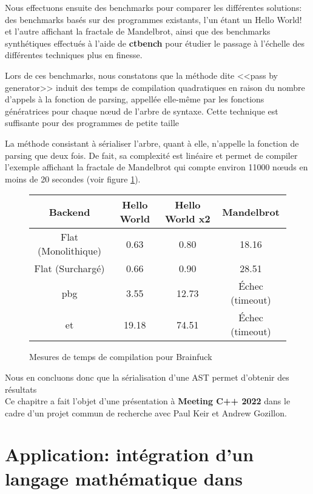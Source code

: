 \documentclass[main]{subfiles}
\begin{document}
Nous effectuons ensuite des benchmarks pour comparer
les diff\'erentes solutions: des benchmarks bas\'es sur
des programmes existants, l'un \'etant un Hello World! et l'autre affichant
la fractale de Mandelbrot, ainsi que des benchmarks synth\'etiques effectu\'es
\`a l'aide de \textbf{ctbench} pour \'etudier le passage \`a l'\'echelle
des diff\'erentes techniques plus en finesse.

Lors de ces benchmarks, nous constatons que la m\'ethode dite
<<pass by generator>> induit des temps de compilation quadratiques en raison
du nombre d'appels \`a la fonction de parsing, appell\'ee elle-m\^eme par les
fonctions g\'en\'eratrices pour chaque n\oe{}ud de l'arbre de syntaxe.
Cette technique est suffisante pour des programmes de petite taille

La m\'ethode consistant \`a s\'erialiser l'arbre, quant \`a elle, n'appelle
la fonction de parsing que deux fois. De fait, sa complexit\'e est lin\'eaire
et permet de compiler l'exemple affichant la fractale de Mandelbrot qui compte
environ 11000 n\oe{}uds en moins de 20 secondes (voir figure
\ref{fig:bf-compile-times-fr}).

\begin{figure}[h]
\begin{tabular}{|c|c|c|c|}
\hline
Backend           & Hello World & Hello World x2  & Mandelbrot \\
\hline
Flat (Monolithique) & 0.63        & 0.80            & 18.16 \\
Flat (Surcharg\'e)  & 0.66        & 0.90            & 28.51 \\
\gls{pbg}           & 3.55        & 12.73           & \'Echec (timeout) \\
\gls{et}            & 19.18       & 74.51           & \'Echec (timeout) \\
\hline
\end{tabular}
\caption{Mesures de temps de compilation pour Brainfuck}
\label{fig:bf-compile-times-fr}
\end{figure}

Nous en concluons donc que la s\'erialisation d'une AST permet d'obtenir des
r\'esultats
\\

Ce chapitre a fait l'objet d'une pr\'esentation \`a \textbf{Meeting C++ 2022}
dans le cadre d'un projet commun de recherche avec Paul Keir et Andrew Gozillon.

\section{
  Application: int\'egration d'un langage math\'ematique dans \cpp
}
\end{document}
